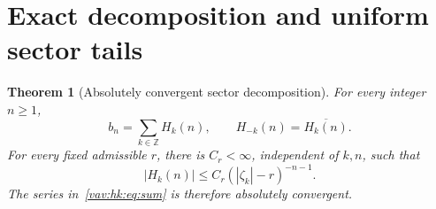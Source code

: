 \documentclass[11pt]{article}
\newtheorem{theorem}{Theorem}[section]
\theoremstyle{remark}\newtheorem{remark}[theorem]{Remark}
\newcommand{\Z}{\mathbb Z}
\begin{document}
\section{Exact decomposition and uniform sector tails}\label{vav:hk:sec:decomposition}
\begin{theorem}[Absolutely convergent sector decomposition]\label{vav:hk:thm:sum}
For every integer $n\geq1$,
\begin{equation}\label{vav:hk:eq:sum}
 b_n=\sum_{k\in\Z}H_k(n),\qquad
 H_{-k}(n)=\overline{H_k(n)}.
\end{equation}
For every fixed admissible $r$, there is $C_r<\infty$, independent of $k,n$, such that
\begin{equation}\label{vav:hk:eq:uniformbound}
 |H_k(n)|\leq C_r(|\zeta_k|-r)^{-n-1}.
\end{equation}
The series in~\eqref{vav:hk:eq:sum} is therefore absolutely convergent.
\end{theorem}
\end{document}
